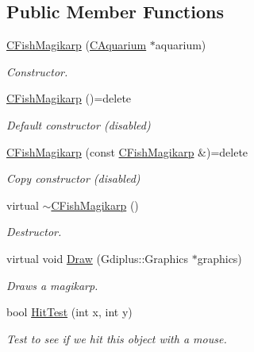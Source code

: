 \subsection*{Public Member Functions}
\begin{DoxyCompactItemize}
\item 
\hyperlink{class_c_fish_magikarp_a364e91206c27040f653fa6c1bc831765}{C\+Fish\+Magikarp} (\hyperlink{class_c_aquarium}{C\+Aquarium} $\ast$aquarium)
\begin{DoxyCompactList}\small\item\em Constructor. \end{DoxyCompactList}\item 
\mbox{\label{class_c_fish_magikarp_a16485d202082b7ad5f1f84182f8d0caa}} 
\hyperlink{class_c_fish_magikarp_a16485d202082b7ad5f1f84182f8d0caa}{C\+Fish\+Magikarp} ()=delete
\begin{DoxyCompactList}\small\item\em Default constructor (disabled) \end{DoxyCompactList}\item 
\mbox{\label{class_c_fish_magikarp_a75df5f848dad873efb158dd3f2bcbb51}} 
\hyperlink{class_c_fish_magikarp_a75df5f848dad873efb158dd3f2bcbb51}{C\+Fish\+Magikarp} (const \hyperlink{class_c_fish_magikarp}{C\+Fish\+Magikarp} \&)=delete
\begin{DoxyCompactList}\small\item\em Copy constructor (disabled) \end{DoxyCompactList}\item 
virtual \hyperlink{class_c_fish_magikarp_a6e859fe9c79b553c6b94e110d843e4f9}{$\sim$\+C\+Fish\+Magikarp} ()
\begin{DoxyCompactList}\small\item\em Destructor. \end{DoxyCompactList}\item 
virtual void \hyperlink{class_c_fish_magikarp_acb88cf3659f4cebd4784e7039b541c33}{Draw} (Gdiplus\+::\+Graphics $\ast$graphics)
\begin{DoxyCompactList}\small\item\em Draws a magikarp. \end{DoxyCompactList}\item 
bool \hyperlink{class_c_fish_magikarp_ad23ff73aff08103618b8162dcaaf01b6}{Hit\+Test} (int x, int y)
\begin{DoxyCompactList}\small\item\em Test to see if we hit this object with a mouse. \end{DoxyCompactList}\end{DoxyCompactItemize}
